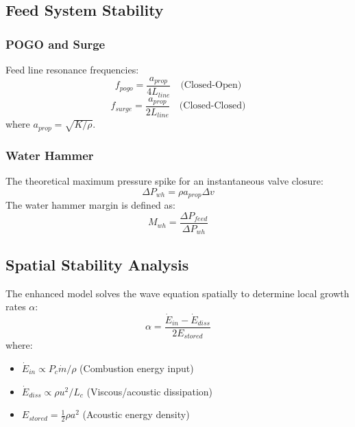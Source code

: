 \subsection{Feed System Stability}

\subsubsection{POGO and Surge}
Feed line resonance frequencies:
\begin{equation}
f_{pogo} = \frac{a_{prop}}{4 L_{line}} \quad \text{(Closed-Open)}
\end{equation}
\begin{equation}
f_{surge} = \frac{a_{prop}}{2 L_{line}} \quad \text{(Closed-Closed)}
\end{equation}
where \(a_{prop} = \sqrt{K/\rho}\).

\subsubsection{Water Hammer}
The theoretical maximum pressure spike for an instantaneous valve closure:
\begin{equation}
\Delta P_{wh} = \rho a_{prop} \Delta v
\end{equation}
The water hammer margin is defined as:
\begin{equation}
M_{wh} = \frac{\Delta P_{feed}}{\Delta P_{wh}}
\end{equation}

\subsection{Spatial Stability Analysis}
The enhanced model solves the wave equation spatially to determine local growth rates \(\alpha\):
\begin{equation}
\alpha = \frac{\dot{E}_{in} - \dot{E}_{diss}}{2 E_{stored}}
\end{equation}
where:
\begin{itemize}
    \item \(\dot{E}_{in} \propto P_c \dot{m} / \rho\) (Combustion energy input)
    \item \(\dot{E}_{diss} \propto \rho u^2 / L_c\) (Viscous/acoustic dissipation)
    \item \(E_{stored} = \frac{1}{2} \rho a^2\) (Acoustic energy density)
\end{itemize}

